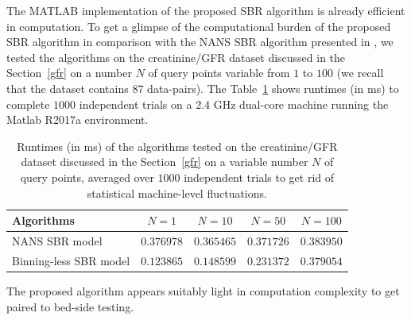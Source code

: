 \documentclass[10pt,final]{siamltex}
\begin{document}
\begin{appendix}
The MATLAB implementation of the proposed SBR algorithm is already efficient in computation. To get a glimpse of the computational burden of the proposed SBR algorithm in comparison with the NANS SBR algorithm presented in \cite{fiori}, we tested the algorithms on the creatinine/GFR dataset discussed in the Section~\ref{gfr} on a number $N$ of query points variable from $1$ to $100$ (we recall that the dataset contains $87$ data-pairs). The Table~\ref{timestats} shows runtimes (in ms) to complete $1000$ independent trials on a 2.4 GHz dual-core machine running the Matlab R2017a environment.
%
\begin{table}[ht]
  \centering
  \begin{tabular}{|l|c|c|c|c|}
    \hline
    \textbf{Algorithms}             &$N=1$ &$N=10$  &$N=50$  &$N=100$ \\
    \hline
    NANS SBR model                  &$0.376978$  &$0.365465$  &$0.371726$  &$0.383950$  \\
    Binning-less SBR model           &$0.123865$  &$0.148599$  &$0.231372$  &$0.379054$  \\
    \hline
  \end{tabular}
  \caption{Runtimes (in ms) of the algorithms tested on the creatinine/GFR dataset discussed in the Section~\ref{gfr} on a variable number $N$ of query points, averaged over $1000$ independent trials to get rid of statistical machine-level fluctuations.}
  \label{timestats}
\end{table}
%

The proposed algorithm appears suitably light in computation complexity to get paired to bed-side testing.
\end{appendix}
\end{document}
